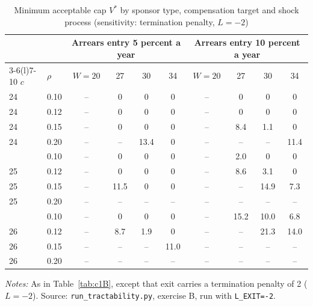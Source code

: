 \begin{table}[htbp]
\begin{threeparttable}
\end{threeparttable}\end{table}

\begin{table}[htbp]\centering\small
\caption{Minimum acceptable cap $V^*$ by sponsor type, compensation target and shock process (sensitivity: termination penalty, $L = -2$)}\label{tab:c1B0}
\begin{threeparttable}\begin{tabular}{llcccccccc}\toprule
 & & \multicolumn{4}{c}{Arrears entry 5 percent a year} & \multicolumn{4}{c}{Arrears entry 10 percent a year}\\\cmidrule(lr){3-6}\cmidrule(l){7-10}
$c$ & $\rho$ & $W{=}20$ & 27 & 30 & 34 & $W{=}20$ & 27 & 30 & 34\\\midrule
24 & 0.10 & -- & 0 & 0 & 0 & -- & 0 & 0 & 0\\
24 & 0.12 & -- & 0 & 0 & 0 & -- & 0 & 0 & 0\\
24 & 0.15 & -- & 0 & 0 & 0 & -- & 8.4 & 1.1 & 0\\
24 & 0.20 & -- & -- & 13.4 & 0 & -- & -- & -- & 11.4\\
\addlinespace
25 & 0.10 & -- & 0 & 0 & 0 & -- & 2.0 & 0 & 0\\
25 & 0.12 & -- & 0 & 0 & 0 & -- & 8.6 & 3.1 & 0\\
25 & 0.15 & -- & 11.5 & 0 & 0 & -- & -- & 14.9 & 7.3\\
25 & 0.20 & -- & -- & -- & -- & -- & -- & -- & --\\
\addlinespace
26 & 0.10 & -- & 0 & 0 & 0 & -- & 15.2 & 10.0 & 6.8\\
26 & 0.12 & -- & 8.7 & 1.9 & 0 & -- & -- & 21.3 & 14.0\\
26 & 0.15 & -- & -- & -- & 11.0 & -- & -- & -- & --\\
26 & 0.20 & -- & -- & -- & -- & -- & -- & -- & --\\
\bottomrule\end{tabular}
\begin{tablenotes}\footnotesize\item \textit{Notes:} As in Table~\ref{tab:c1B}, except that exit carries a termination penalty of 2 ($L = -2$). Source: \texttt{run\_tractability.py}, exercise B, run with \texttt{L\_EXIT=-2}.\end{tablenotes}
\end{threeparttable}\end{table}

